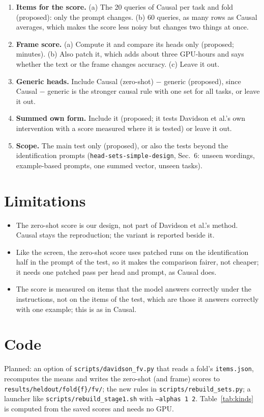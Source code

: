 \documentclass[10pt,a4paper]{article}
\newcommand{\simpledoc}{\texttt{head-sets-simple-design}}
\begin{document}
\begin{enumerate}[label=\textbf{D\arabic*}]
\item \textbf{Items for the score.} (a) The 20 queries of Causal per task and fold (proposed): only the prompt changes. (b) 60 queries, as many rows as Causal averages, which makes the score less noisy but changes two things at once.
\item \textbf{Frame score.} (a) Compute it and compare its heads only (proposed; minutes). (b) Also patch it, which adds about three GPU-hours and says whether the text or the frame changes accuracy. (c) Leave it out.
\item \textbf{Generic heads.} Include Causal (zero-shot) $-$ generic (proposed), since Causal $-$ generic is the stronger causal rule with one set for all tasks, or leave it out.
\item \textbf{Summed own form.} Include it (proposed; it tests Davidson et al.'s own intervention with a score measured where it is tested) or leave it out.
\item \textbf{Scope.} The main test only (proposed), or also the tests beyond the identification prompts (\simpledoc, Sec.~6: unseen wordings, example-based prompts, one summed vector, unseen tasks).
\end{enumerate}

\section{Limitations}\label{sec:limits}

\begin{itemize}
\item The zero-shot score is our design, not part of Davidson et al.'s method. Causal stays the reproduction; the variant is reported beside it.
\item Like the screen, the zero-shot score uses patched runs on the identification half in the prompt of the test, so it makes the comparison fairer, not cheaper; it needs one patched pass per head and prompt, as Causal does.
\item The score is measured on items that the model answers correctly under the instructions, not on the items of the test, which are those it answers correctly with one example; this is as in Causal.
\end{itemize}

\section*{Code}
\sloppy
Planned: an option of \texttt{scripts/davidson\_fv.py} that reads a fold's \texttt{items.json}, recomputes the means and writes the zero-shot (and frame) scores to \texttt{results/heldout/fold\{f\}/fv/}; the new rules in \texttt{scripts/rebuild\_sets.py}; a launcher like \texttt{scripts/rebuild\_stage1.sh} with \texttt{--alphas 1 2}. Table~\ref{tab:kinds} is computed from the saved scores and needs no GPU.



\end{document}
